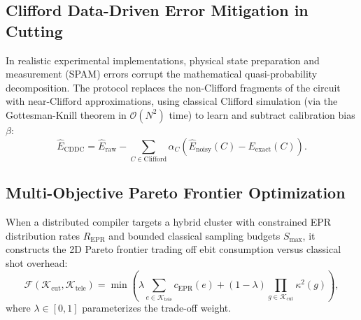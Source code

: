 \subsection{Clifford Data-Driven Error Mitigation in Cutting}
In realistic experimental implementations, physical state preparation and measurement (SPAM) errors corrupt the mathematical quasi-probability decomposition. The  protocol replaces the non-Clifford fragments of the circuit with near-Clifford approximations, using classical Clifford simulation (via the Gottesman-Knill theorem in $\mathcal{O}(N^2)$ time) to learn and subtract calibration bias $\beta$:
\begin{equation}
    \hat{E}_{\text{CDDC}} = \hat{E}_{\text{raw}} - \sum_{C \in \text{Clifford}} \alpha_C \left( \hat{E}_{\text{noisy}}(C) - E_{\text{exact}}(C) \right).
\end{equation}

\subsection{Multi-Objective Pareto Frontier Optimization}
When a distributed compiler targets a hybrid cluster with constrained EPR distribution rates $R_{\text{EPR}}$ and bounded classical sampling budgets $S_{\max}$, it constructs the 2D Pareto frontier trading off ebit consumption versus classical shot overhead:
\begin{equation}
    \mathcal{F}(\mathcal{K}_{\text{cut}}, \mathcal{K}_{\text{tele}}) = \min \left( \lambda \sum_{e \in \mathcal{K}_{\text{tele}}} c_{\text{EPR}}(e) + (1 - \lambda) \prod_{g \in \mathcal{K}_{\text{cut}}} \kappa^2(g) \right),
\end{equation}
where $\lambda \in [0, 1]$ parameterizes the trade-off weight.

